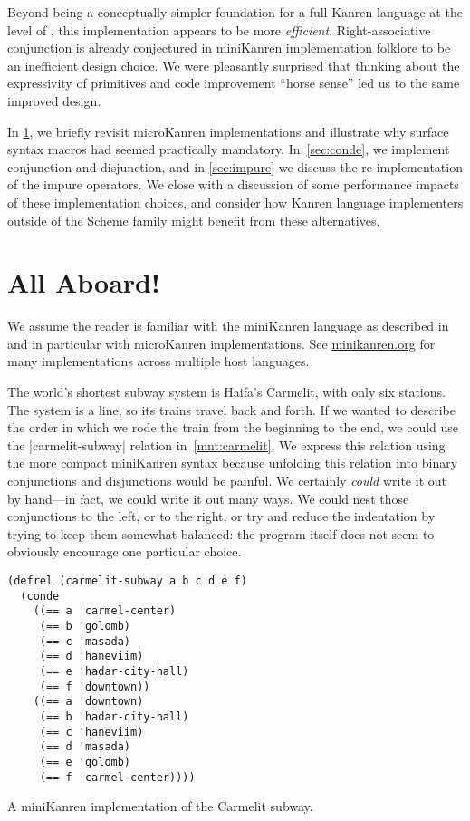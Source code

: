 \documentclass[sigplan,screen,draft,anonymous,review,natbib=false]{acmart}
\begin{document}
Beyond being a conceptually simpler foundation for a full Kanren
language at the level of , this
implementation appears to be more \emph{efficient}. Right-associative
conjunction is already conjectured in miniKanren implementation
folklore to be an inefficient design choice. We were pleasantly
surprised that thinking about the expressivity of primitives and code
improvement \enquote{horse sense} led us to the same improved design.

In \cref{sec:all-aboard}, we briefly revisit microKanren
implementations and illustrate why surface syntax macros had seemed
practically mandatory. In~\cref{sec:conde}, we implement conjunction
and disjunction, and in \cref{sec:impure} we discuss the
re-implementation of the impure operators. We close with a discussion
of some performance impacts of these implementation choices, and
consider how Kanren language implementers outside of the Scheme family
might benefit from these alternatives.

\section{All Aboard!}\label{sec:all-aboard}

We assume the reader is familiar with the miniKanren language as
described in  and in particular with
microKanren implementations. See \href{minikanren.org}{minikanren.org}
for many implementations across multiple host languages.

The world's shortest subway system is Haifa's Carmelit, with only
six stations. The system is a line, so its trains travel back and
forth. If we wanted to describe the order in which we rode the train
from the beginning to the end, we could use the
\rackinline|carmelit-subway| relation in~\cref{mnt:carmelit}. We
express this relation using the more compact miniKanren syntax because
unfolding this relation into binary conjunctions and disjunctions
would be painful. We certainly \emph{could} write it out by hand---in
fact, we could write it out many ways. We could nest those
conjunctions to the left, or to the right, or try and reduce the
indentation by trying to keep them somewhat balanced: the program
itself does not seem to obviously encourage one particular choice.

\begin{listing}
  \begin{verbatim}
(defrel (carmelit-subway a b c d e f)
  (conde
    ((== a 'carmel-center)
     (== b 'golomb)
     (== c 'masada)
     (== d 'haneviim)
     (== e 'hadar-city-hall)
     (== f 'downtown))
    ((== a 'downtown)
     (== b 'hadar-city-hall)
     (== c 'haneviim)
     (== d 'masada)
     (== e 'golomb)
     (== f 'carmel-center))))
  \end{verbatim}
  \caption{A miniKanren implementation of the Carmelit subway.}
  \label{mnt:carmelit}
\end{listing}
\end{document}
